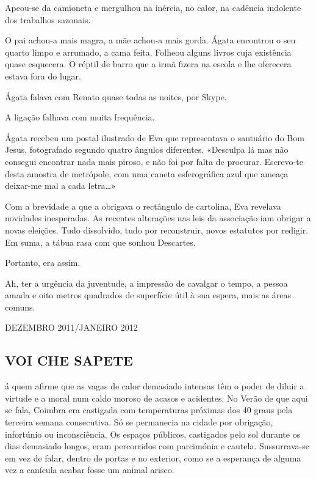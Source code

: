 Apeou-se da camioneta e mergulhou na inércia, no calor,
na cadência indolente dos trabalhos sazonais.

O pai achou-a mais magra, a mãe achou-a mais gorda. Ágata encontrou o
seu quarto limpo e arrumado, a cama feita. Folheou alguns livros cuja
existência quase esquecera. O réptil de barro que a irmã fizera na
escola e lhe oferecera estava fora do lugar.

Ágata falava com Renato quase todas as noites, por Skype.

A ligação falhava com muita frequência.

Ágata recebeu um postal ilustrado de Eva que representava o santuário
do Bom Jesus, fotografado segundo quatro ângulos diferentes. «Desculpa
lá mas não consegui encontrar nada mais piroso, e não foi por falta de
procurar. Escrevo-te desta amostra de metrópole, com uma caneta esferográfica azul que
ameaça deixar-me mal a cada letra\ldots{}»

Com a brevidade a que a obrigava o rectângulo de cartolina, Eva
revelava novidades inesperadas. As recentes alterações nas leis da
associação iam obrigar a novas eleições. Tudo dissolvido, tudo por
reconstruir, novos estatutos por redigir. Em suma, a tábua rasa com que
sonhou Descartes.

Portanto, era assim.

Ah, ter a urgência da juventude, a impressão de cavalgar o tempo, a
pessoa amada e oito metros quadrados de superfície útil à sua espera,
mais as áreas comuns.

DEZEMBRO 2011/JANEIRO 2012

\subsection{VOI CHE SAPETE}

á quem afirme que as vagas de calor demasiado intensas têm o poder de
diluir a virtude e a moral num caldo moroso de acasos e acidentes. No
Verão de que aqui se fala, Coimbra era castigada com temperaturas
próximas dos 40 graus pela terceira semana consecutiva. Só se permanecia
na cidade por obrigação, infortúnio ou inconsciência. Os espaços
públicos, castigados pelo sol durante os dias demasiado longos, eram
percorridos com parcimónia e cautela. Sussurrava-se em vez de falar,
dentro de portas e no exterior, como se a esperança de alguma vez a
canícula acabar fosse um animal arisco.

